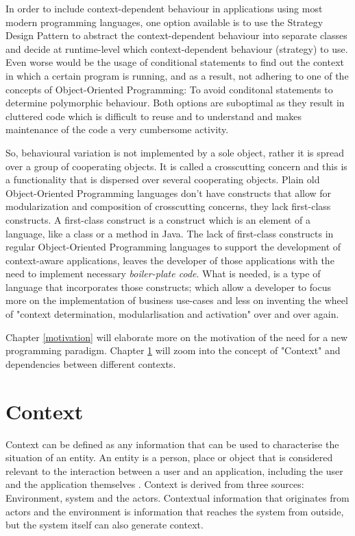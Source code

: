 \documentclass{acm_proc_article-sp}
\begin{document}
In order to include context-dependent behaviour in applications using most modern programming languages, one option available is to use the Strategy Design Pattern \cite{strategypattern} to abstract the context-dependent behaviour into separate classes and decide at runtime-level which context-dependent behaviour (strategy) to use. Even worse would be the usage of conditional statements to find out the context in which a certain program is running, and as a result, not adhering to one of the concepts of Object-Oriented Programming: To avoid conditonal statements to determine polymorphic behaviour. Both options are suboptimal as they result in cluttered code which is difficult to reuse and to understand and makes maintenance of the code a very cumbersome activity.

So, behavioural variation is not implemented by a sole object, rather it is spread over a group of cooperating objects. It is called a crosscutting concern \cite{kiczalesetallaop} and this is a functionality that is dispersed over several cooperating objects. Plain old Object-Oriented Programming languages don't have constructs that allow for modularization and composition of crosscutting concerns, they lack first-class constructs. A first-class construct \cite{Keays:2003:CP:940923.940926} is a construct which is an element of a language, like a class or a method in Java. The lack of first-class constructs in regular Object-Oriented Programming languages to support the development of context-aware applications, leaves the developer of those applications with the need to implement necessary \textit{boiler-plate code}. What is needed, is a type of language that incorporates those constructs; which allow a developer to focus more on the implementation of business use-cases and less on inventing the wheel of "context determination, modularlisation and activation" over and over again. 

Chapter \ref{motivation} will elaborate more on the motivation of the need for a new programming paradigm. Chapter \ref{context} will zoom into the concept of "Context" and dependencies between different contexts. 

\section{Context}\label{context}
Context can be defined as any information that can be used to characterise the situation of an entity. An entity is a person, place or object that is considered relevant to the interaction between a user and an application, including the user and the application themselves \cite{Abowd:1999:TBU:647985.743843}. Context is derived from three sources: Environment, system and the actors. Contextual information that originates from actors and the environment is information that reaches the system from outside, but the system itself can also generate context. 
\end{document}
